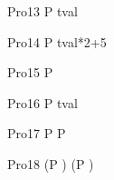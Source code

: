 \begin{circus}
    \circprocess Pro13 \circdef P \circendby \lcirctime tval \rcirctime \\
\end{circus}        

\begin{circus}
   \circprocess Pro14 \circdef P \circendby \lcirctime tval*2+5 \rcirctime \\
\end{circus}        

\begin{circus}
    \circprocess Pro15 \circdef P \circendby {}  \rcirctime \\
\end{circus}        

\begin{circus}
    \circprocess Pro16 \circdef P \circendby {} \upto tval \rcirctime  \\
\end{circus} 


\begin{circus}
    \circprocess Pro17 \circdef P \circendby {} \rcirctime  \circinterrupt P \circendby {} \rcirctime \\
\end{circus}

\begin{circus}
    \circprocess Pro18 \circdef (P \circendby {} \rcirctime ) \circinterrupt (P \circendby {} \rcirctime ) \\
\end{circus}




